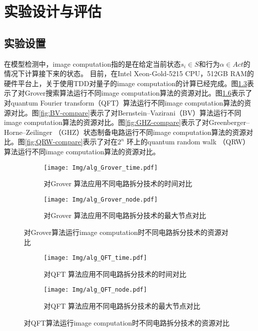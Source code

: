 \chapter{实验设计与评估}
\section{实验设置}
在模型检测中，image computation指的是在给定当前状态$s_i\in S$和行为$\alpha\in Act$的情况下计算接下来的状态。
目前，在Intel Xeon-Gold-5215 CPU，512GB RAM的硬件平台上，关于使用TDD对量子的image computation的计算已经完成。图\ref{fig:grover-compare}表示了对Grover搜索算法运行不同image computation算法的资源对比。图\ref{fig:QFT-compare}表示了对quantum Fourier transform（QFT）算法运行不同image computation算法的资源对比。图\ref{fig:BV-compare}表示了对Bernstein–Vazirani（BV）算法运行不同image computation算法的资源对比。图\ref{fig:GHZ-compare}表示了对Greenberger–Horne–Zeilinger （GHZ）状态制备电路运行不同image computation算法的资源对比。图\ref{fig:QRW-compare}表示了对在$2^n$ 环上的quantum random walk （QRW）算法运行不同image computation算法的资源对比。
\begin{figure}[!htbp]
    \centering
    \begin{subfigure}[b]{.4\textwidth}
        \centering
        \texttt{[image: Img/alg\_Grover\_time.pdf]}
        \caption{对Grover 算法应用不同电路拆分技术的时间对比}
        \label{fig:grover-time}
    \end{subfigure}
    \qquad
    \begin{subfigure}[b]{.4\textwidth}
        \centering
        \texttt{[image: Img/alg\_Grover\_node.pdf]}
        \caption{对Grover 算法应用不同电路拆分技术的最大节点对比}
        \label{fig:grover-node}
    \end{subfigure}
    
    \caption{对Grover算法运行image computation时不同电路拆分技术的资源对比}
    \label{fig:grover-compare}
\end{figure}
\begin{figure}[!htbp]
    \centering
    \begin{subfigure}[b]{.4\textwidth}
        \centering
        \texttt{[image: Img/alg\_QFT\_time.pdf]}
        \caption{对QFT 算法应用不同电路拆分技术的时间对比}
        \label{fig:QFT-time}
    \end{subfigure}
    \qquad
    \begin{subfigure}[b]{.4\textwidth}
        \centering
        \texttt{[image: Img/alg\_QFT\_node.pdf]}
        \caption{对QFT 算法应用不同电路拆分技术的最大节点对比}
        \label{fig:QFT-node}
    \end{subfigure}
    \caption{对QFT算法运行image computation时不同电路拆分技术的资源对比}
    \label{fig:QFT-compare}
\end{figure}
